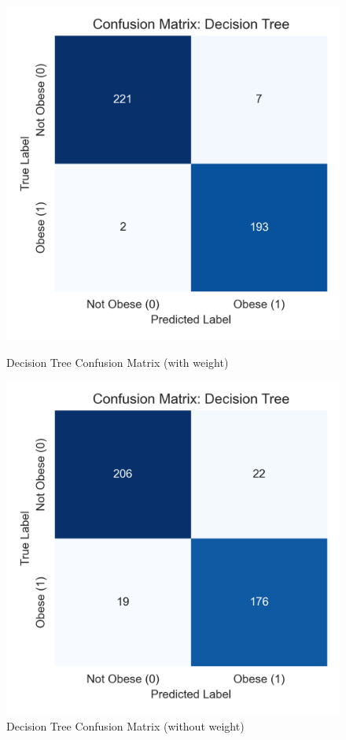 \documentclass[a4paper,12pt]{article}
\begin{document}
\begin{figure}[H]
\centering
\begin{minipage}{0.35\textwidth}
    \centering
    \includegraphics[width=\linewidth]{decision_tree_confusion.png}
    \caption{Decision Tree Confusion Matrix (with weight)}
\end{minipage}
\hspace{0.04\textwidth}
\begin{minipage}{0.35\textwidth}
    \centering
    \includegraphics[width=\linewidth]{decision_tree_confusion_withoutWeight.png}
    \caption{Decision Tree Confusion Matrix (without weight)}
\end{minipage}
\label{fig:decision_weight_comparison}
\end{figure}
\end{document}
